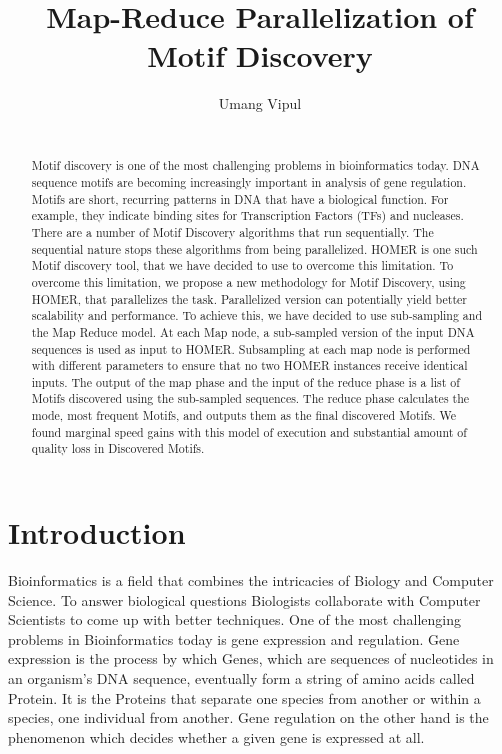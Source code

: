 \documentclass{acm_proc_article-sp}
\begin{document}
\title{Map-Reduce Parallelization of Motif Discovery}



 \author{
\alignauthor
Umang Vipul\\
       \\
}    






\maketitle
\begin{abstract}
Motif discovery is one of the most challenging problems in bioinformatics today.  DNA sequence motifs are becoming increasingly important in analysis of gene regulation. Motifs are short, recurring patterns in DNA that have a biological function. For example, they indicate binding sites for Transcription Factors (TFs) and nucleases. There are a number of Motif Discovery algorithms that run sequentially. The sequential nature stops these algorithms from being parallelized. HOMER is one such Motif discovery tool, that we have decided to use to overcome this limitation.
To overcome this limitation, we propose a new methodology for Motif Discovery, using HOMER, that parallelizes the task. Parallelized version can potentially yield better scalability and performance. To achieve this, we have decided to use sub-sampling and the Map Reduce model. 
At each Map node, a sub-sampled version of the input DNA sequences is used as input to HOMER. Subsampling at each map node is performed with different parameters to ensure that no two HOMER instances receive identical inputs. The output of the map phase and the input of the reduce phase is a list of Motifs discovered using the sub-sampled sequences. The reduce phase calculates the mode, most frequent Motifs, and outputs them as the final discovered Motifs. We found marginal speed gains with this model of execution and substantial amount of quality loss in Discovered Motifs.
\end{abstract}



\section{Introduction}
Bioinformatics is a field that combines the intricacies of Biology and Computer Science. To answer biological questions Biologists collaborate with Computer Scientists to come up with  better techniques. One of the most challenging problems in Bioinformatics today is gene expression and regulation. Gene expression is the process by which Genes, which are sequences of nucleotides in an organism's DNA sequence, eventually form a string of amino acids called Protein. It is the Proteins that separate one species from another or within a species, one individual from another. Gene regulation on the other hand is the phenomenon which decides whether a given gene is expressed at all. 
\end{document}
